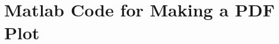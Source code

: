 \documentclass[letterpaper,12pt,titlepage,oneside,final]{book}
\theoremstyle{plain}
\let\origdoublepage\cleardoublepage
\newcommand{\clearemptydoublepage}{%
  \clearpage{\pagestyle{empty}\origdoublepage}}
\let\cleardoublepage\clearemptydoublepage
\begin{document}
\chapter[PDF Plots From Matlab]{Matlab Code for Making a PDF Plot}
\label{AppendixA}





\cleardoublepage %
\renewcommand*{\bibname}{References}




\nocite{*}
\end{document}
